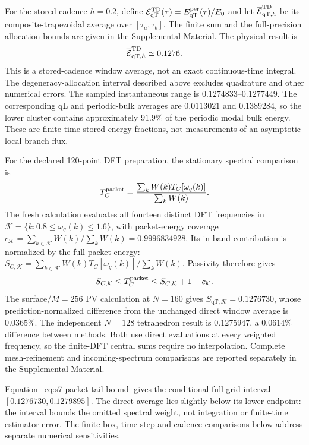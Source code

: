 \documentclass[10pt,aps,pre,reprint,floatfix,notitlepage,nofootinbib]{revtex4-2}
\newcommand{\qT}{\mathrm{qT}}
\begin{document}
For the stored cadence $h=0.2$, define $\mathcal E_{\qT}^{\rm TD}(\tau)=E_{\qT}^{\rm per}(\tau)/E_0$ and let $\overline{\mathcal E}_{\qT,h}^{\rm TD}$ be its composite-trapezoidal average over $[\tau_a,\tau_b]$. The finite sum and the full-precision allocation bounds are given in the Supplemental Material. The physical result is
\begin{equation}
 \overline{\mathcal E}_{\qT,h}^{\rm TD}\simeq0.1276.
 \label{eq:s7-direct-result}
\end{equation}
This is a stored-cadence window average, not an exact continuous-time integral. The degeneracy-allocation interval described above excludes quadrature and other numerical errors. The sampled instantaneous range is $0.1274833$--$0.1277449$. The corresponding qL and periodic-bulk averages are $0.0113021$ and $0.1389284$, so the lower cluster contains approximately $91.9\%$ of the periodic modal bulk energy. These are finite-time stored-energy fractions, not measurements of an asymptotic local branch flux.

For the declared 120-point DFT preparation, the stationary spectral comparison is
\begin{equation}
 T_C^{\rm packet}
 =\frac{\sum_k W(k)T_C[\omega_q(k)]}{\sum_k W(k)}.
 \label{eq:s7-packet-average}
\end{equation}
The fresh calculation evaluates all fourteen distinct DFT frequencies in $\mathcal K=\{k:0.8\le\omega_q(k)\le1.6\}$, with packet-energy coverage $c_{\mathcal K}=\sum_{k\in\mathcal K}W(k)/\sum_kW(k)=0.9996834928$. Its in-band contribution is normalized by the full packet energy: $S_{C,\mathcal K}=\sum_{k\in\mathcal K}W(k)T_C[\omega_q(k)]/\sum_kW(k)$. Passivity therefore gives
\begin{equation}
 S_{C,\mathcal K}\le T_C^{\rm packet}
 \le S_{C,\mathcal K}+1-c_{\mathcal K}.
 \label{eq:s7-packet-tail-bound}
\end{equation}
The surface/$M=256$ PV calculation at $N=160$ gives $S_{\qT,\mathcal K}=0.1276730$, whose prediction-normalized difference from the unchanged direct window average is $0.0365\%$. The independent $N=128$ tetrahedron result is $0.1275947$, a $0.0614\%$ difference between methods. Both use direct evaluations at every weighted frequency, so the finite-DFT central sums require no interpolation. Complete mesh-refinement and incoming-spectrum comparisons are reported separately in the Supplemental Material.

Equation~\eqref{eq:s7-packet-tail-bound} gives the conditional full-grid interval $[0.1276730,0.1279895]$. The direct average lies slightly below its lower endpoint: the interval bounds the omitted spectral weight, not integration or finite-time estimator error. The finite-box, time-step and cadence comparisons below address separate numerical sensitivities.
\end{document}
